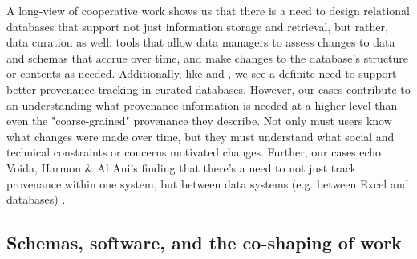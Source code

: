 A long-view of cooperative work shows us that there is a need to design relational databases that support not just information storage and retrieval, but rather, data curation as well: tools that allow data managers to assess changes to data and schemas that accrue over time, and make changes to the database's structure or contents as needed. Additionally, like \cite{Buneman_2006} and \cite{jagadish2007making}, we see a definite need to support better provenance tracking in curated databases. However, our cases contribute to an understanding what provenance information is needed at a higher level than even the "coarse-grained" provenance they describe. Not only must users know what changes were made over time, but they must understand what social and technical constraints or concerns motivated changes. Further, our cases echo Voida, Harmon & Al Ani's finding that there's a need to not just track provenance within one system, but between data systems (e.g. between Excel and databases) \cite{voida2011homebrew}.

\subsection{Schemas, software, and the co-shaping of work}

